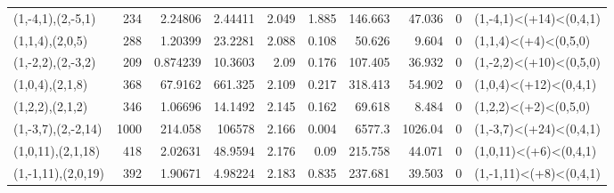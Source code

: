 \begin{tabular}{lrrrrrrrrl}
 (1,-4,1),(2,-5,1)  &    234 &   2.24806  &      2.44411 &        2.049 &      1.885 &          146.663 &         47.036 &        0 & (1,-4,1)<(+14)<(0,4,1) \\
 (1,1,4),(2,0,5)    &    288 &   1.20399  &     23.2281  &        2.088 &      0.108 &           50.626 &          9.604 &        0 & (1,1,4)<(+4)<(0,5,0)   \\
 (1,-2,2),(2,-3,2)  &    209 &   0.874239 &     10.3603  &        2.09  &      0.176 &          107.405 &         36.932 &        0 & (1,-2,2)<(+10)<(0,5,0) \\
 (1,0,4),(2,1,8)    &    368 &  67.9162   &    661.325   &        2.109 &      0.217 &          318.413 &         54.902 &        0 & (1,0,4)<(+12)<(0,4,1)  \\
 (1,2,2),(2,1,2)    &    346 &   1.06696  &     14.1492  &        2.145 &      0.162 &           69.618 &          8.484 &        0 & (1,2,2)<(+2)<(0,5,0)   \\
 (1,-3,7),(2,-2,14) &   1000 & 214.058    & 106578       &        2.166 &      0.004 &         6577.3   &       1026.04  &        0 & (1,-3,7)<(+24)<(0,4,1) \\
 (1,0,11),(2,1,18)  &    418 &   2.02631  &     48.9594  &        2.176 &      0.09  &          215.758 &         44.071 &        0 & (1,0,11)<(+6)<(0,4,1)  \\
 (1,-1,11),(2,0,19) &    392 &   1.90671  &      4.98224 &        2.183 &      0.835 &          237.681 &         39.503 &        0 & (1,-1,11)<(+8)<(0,4,1) \\
\hline
\end{tabular}